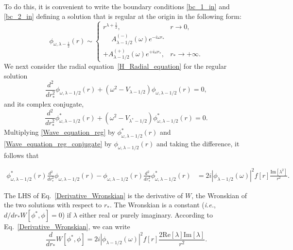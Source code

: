 \documentclass[aps,prd,longbibliography,reprint,twocolumn,amsmath,amssymb,amsfonts,showpacs,footnote,superscriptaddress]{revtex4-1}%
\begin{document}
To do this, it is convenient to write the boundary conditions \eqref{bc_1_in} and \eqref{bc_2_in} defining a solution that is regular at the origin in the following form:
\begin{equation}
\label{bc_CAM}
\phi_{\omega,\lambda-\frac{1}{2}}(r) \sim
\begin{cases}
r^{\lambda+\frac{1}{2}}, &
r \rightarrow 0, \\
\phantom{+} A_{\lambda-1/2}^{(-)}(\omega) e^{-i\omega r_*} & \\
 + A_{\lambda-1/2}^{(+)}(\omega) e^{+i\omega r_*} , &r_* \rightarrow +\infty.
\end{cases}
\end{equation}
%
We next consider the radial equation~\eqref{H_Radial_equation} for the regular solution
\begin{equation}\label{Wave_equation_reg}
   \frac{d^2}{dr_*^2}\phi_{\omega,\lambda-1/2}(r)+\left(\omega^2 -V_{\lambda-1/2}\right) \phi_{\omega,\lambda-1/2}(r) =0,
 \end{equation}
and its complex conjugate,
 \begin{equation}\label{Wave_equation_reg_conjugate}
   \frac{d^2}{dr_*^2}\phi^*_{\omega,\lambda-1/2}(r)+ \left(\omega^2 -V_{\lambda^*-1/2}\right)\phi^*_{\omega,{\lambda-1/2}}(r) = 0 .
 \end{equation}
Multiplying \eqref{Wave_equation_reg} by $\phi^*_{\omega,\lambda-1/2}(r)$ and \eqref{Wave_equation_reg_conjugate} by $\phi_{\omega,\lambda-1/2}(r)$ and taking the difference, it follows that
\begin{widetext}
\begin{equation}\label{Derivative_Wronskian}
\begin{aligned}
 \phi^*_{\omega,\lambda-1/2}(r) \frac{d^2}{dr_*^2}\phi_{\omega,\lambda-1/2}(r) - \phi_{\omega,\lambda-1/2}(r) \frac{d^2}{dr_*^2} \phi^*_{\omega,\lambda-1/2}(r) %
                           &= 2 i|\phi_{\lambda-1/2}(\omega)|^2 f[r]\frac{\text{Im}[\lambda^2]}{r^2} .
 \end{aligned}
\end{equation}
\end{widetext}
The LHS of Eq.~\eqref{Derivative_Wronskian} is the derivative of $W$, the Wronskian of the two solutions with respect to $r_*$. The Wronskian is a constant (\textit{i.e.}, $d/dr_* W[\phi^*,\phi] = 0$) if $\lambda$ either real or purely imaginary. According to Eq.~\eqref{Derivative_Wronskian}, we can write
\begin{equation}\label{Derivative_Wronskian_bis}
\frac{d}{dr_*}W[\phi^*,\phi]= 2i|\phi_{\lambda-1/2}(\omega)|^2 f[r]\frac{2\text{Re}[\lambda]\text{Im}[\lambda]}{r^2}.
\end{equation}
\end{document}
